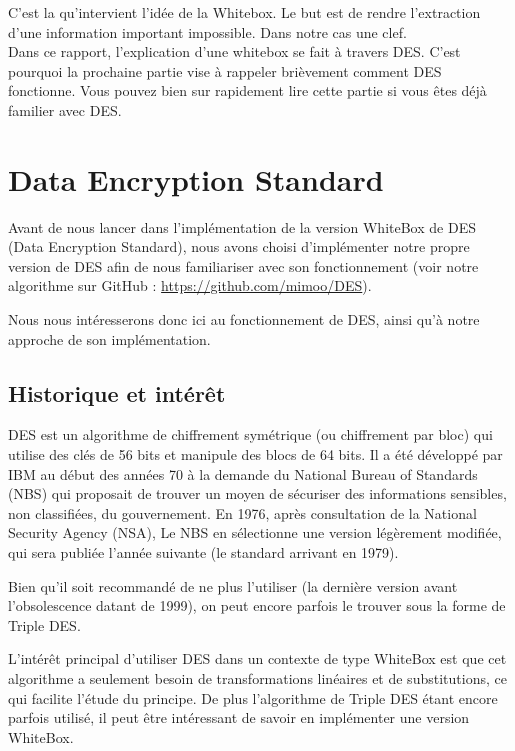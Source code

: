 \documentclass[a4paper,12pt]{article}
\begin{document}
C'est la qu'intervient l'idée de la Whitebox. Le but est de rendre l'extraction d'une information important impossible. Dans notre cas une clef.\\
Dans ce rapport, l'explication d'une whitebox se fait à travers DES. C'est pourquoi la prochaine partie vise à rappeler brièvement comment DES fonctionne. Vous pouvez bien sur rapidement lire cette partie si vous êtes déjà familier avec DES.

\newpage
	
\section{Data Encryption Standard}

Avant de nous lancer dans l'implémentation de la version WhiteBox de DES (Data Encryption Standard), nous avons choisi d'implémenter notre propre version de DES afin de nous familiariser avec son fonctionnement (voir notre algorithme sur GitHub : \url{https://github.com/mimoo/DES}).
	
Nous nous intéresserons donc ici au fonctionnement de DES, ainsi qu'à notre approche de son implémentation.

\subsection{Historique et intérêt}

DES est un algorithme de chiffrement symétrique (ou chiffrement par bloc) qui utilise des clés de 56 bits et manipule des blocs de 64 bits. Il a été développé par IBM au début des années 70 à la demande du National Bureau of Standards (NBS) qui proposait de trouver un moyen de sécuriser des informations sensibles, non classifiées, du gouvernement. En 1976, après consultation de la National Security Agency (NSA), Le NBS en sélectionne une version légèrement modifiée, qui sera publiée l'année suivante (le standard arrivant en 1979).

Bien qu'il soit recommandé de ne plus l'utiliser (la dernière version avant l'obsolescence datant de 1999), on peut encore parfois le trouver sous la forme de Triple DES.
	
L'intérêt principal d'utiliser DES dans un contexte de type WhiteBox est que cet algorithme a seulement besoin de transformations linéaires et de substitutions, ce qui facilite l'étude du principe. De plus l'algorithme de Triple DES étant encore parfois utilisé, il peut être intéressant de savoir en implémenter une version WhiteBox.
	
\end{document}
